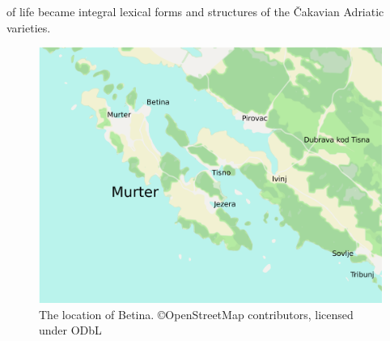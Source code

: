 \documentclass[output=paper]{LSP/langsci}
\begin{document}
of life became integral lexical forms and structures of the Čakavian  Adriatic varieties.

\begin{figure}[t]
\includegraphics[height=.47\textheight]{illustrations/skevin_betina4.pdf}
\caption{The location of Betina.  {\tiny ©OpenStreetMap contributors, licensed under ODbL}}
\label{fig:skevin:skevin:betinalocation} 
\end{figure}
\end{document}
